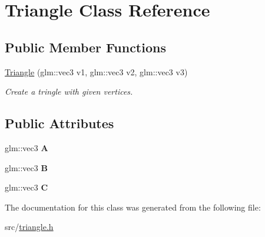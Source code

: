 \hypertarget{classTriangle}{}\section{Triangle Class Reference}
\label{classTriangle}
\subsection*{Public Member Functions}
\begin{DoxyCompactItemize}
\item 
\hyperlink{classTriangle_a30384201618bcd3242b5f37044b61b2f}{Triangle} (glm\+::vec3 v1, glm\+::vec3 v2, glm\+::vec3 v3)\hypertarget{classTriangle_a30384201618bcd3242b5f37044b61b2f}{}\label{classTriangle_a30384201618bcd3242b5f37044b61b2f}

\begin{DoxyCompactList}\small\item\em Create a tringle with given vertices. \end{DoxyCompactList}\end{DoxyCompactItemize}
\subsection*{Public Attributes}
\begin{DoxyCompactItemize}
\item 
glm\+::vec3 {\bfseries A}\hypertarget{classTriangle_a9b799fe52cb351ec93a54cf65a3beea3}{}\label{classTriangle_a9b799fe52cb351ec93a54cf65a3beea3}

\item 
glm\+::vec3 {\bfseries B}\hypertarget{classTriangle_afd89a6e110c31052d98c55667a2a24a7}{}\label{classTriangle_afd89a6e110c31052d98c55667a2a24a7}

\item 
glm\+::vec3 {\bfseries C}\hypertarget{classTriangle_ac098522bde0fdeacb2f0bd25fe293e44}{}\label{classTriangle_ac098522bde0fdeacb2f0bd25fe293e44}

\end{DoxyCompactItemize}


The documentation for this class was generated from the following file\+:\begin{DoxyCompactItemize}
\item 
src/\hyperlink{triangle_8h}{triangle.\+h}\end{DoxyCompactItemize}
